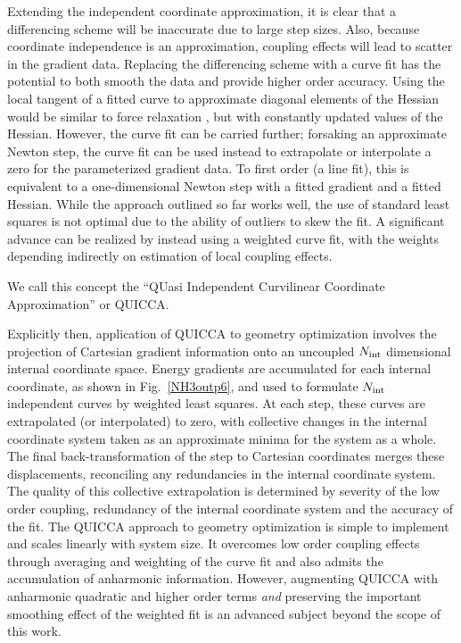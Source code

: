 \documentclass[prl,twocolumn,showpacs,twocolumngrid,superbib]{revtex4}
\begin{document}
Extending the independent coordinate approximation, it is clear that a differencing scheme will be inaccurate 
due to large step sizes.  Also, because coordinate independence is an approximation, coupling effects will lead
to scatter in the gradient data.  Replacing  the differencing scheme with a curve fit has the potential to both 
smooth the data and provide higher order accuracy.  Using the local tangent of a fitted curve to approximate 
diagonal elements of the Hessian 
would be similar to force relaxation \cite{pulay_review,sellers,van_alsenoy_98}, but with constantly updated 
values of the Hessian.  However, the curve fit can be carried further;  forsaking an approximate Newton step, 
the curve fit can be used instead to extrapolate or interpolate a zero for the parameterized gradient data.  
To first order (a line fit), this is equivalent to a one-dimensional Newton step with a fitted gradient and a 
fitted Hessian.   While the approach outlined so far works well, the use of standard least squares is not 
optimal due to the ability of outliers to skew the fit.  A significant advance can be realized by instead using 
a weighted curve fit, with the weights depending indirectly on estimation of local coupling effects. 

We call this concept the ``QUasi Independent Curvilinear Coordinate Approximation'' or QUICCA. 

Explicitly then, application of QUICCA to geometry optimization involves the  projection of Cartesian 
gradient information onto an uncoupled $N_{\rm int}$ dimensional internal coordinate space.  Energy gradients 
are accumulated for each internal coordinate, as shown in Fig.~\ref{NH3outp6}, and used to formulate 
$N_{\rm int}$ independent curves by weighted least squares.  At each step, these curves are extrapolated 
(or interpolated) to zero, with collective changes in the internal coordinate system taken as an approximate 
minima for the system as a whole. The final back-transformation of the step to Cartesian coordinates merges 
these displacements, reconciling any redundancies in the internal coordinate system. The quality of this 
collective extrapolation is determined by severity of the low order coupling, redundancy of the internal 
coordinate system and the accuracy of the fit.  The QUICCA approach to geometry optimization is simple to 
implement and scales linearly with system size.  It overcomes low order coupling effects through averaging and 
weighting of the curve fit and also admits the accumulation of anharmonic information.  However,  augmenting
QUICCA with anharmonic quadratic and higher order terms {\em and} preserving the important smoothing effect of 
the weighted fit is an advanced subject beyond the scope of this work. 
\end{document}
